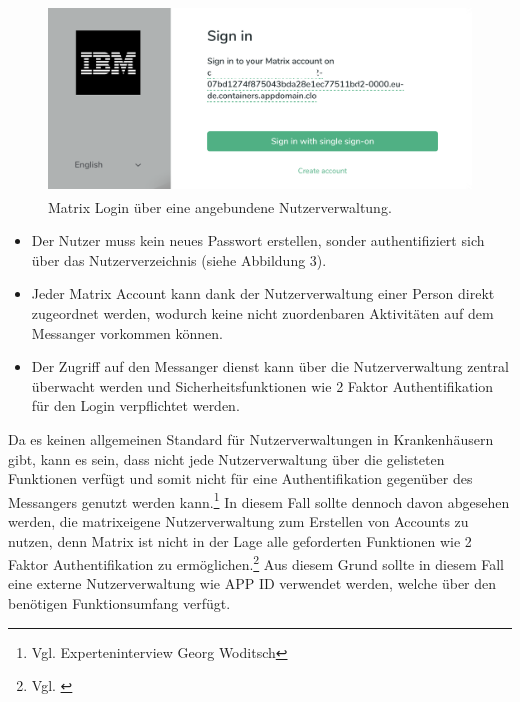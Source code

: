 \begin{figure}[htb]
    \centering
    \includegraphics[height=5cm]{graphics/sso.png}
    \caption[Matrix Login über eine angebundene Nutzerverwaltung]{Matrix Login über eine angebundene Nutzerverwaltung.}
    \label{abb:DHBWLogo}
\end{figure}

\begin{itemize}
    \item Der Nutzer muss kein neues Passwort erstellen, sonder authentifiziert sich über das Nutzerverzeichnis (siehe Abbildung 3).
    \item Jeder Matrix Account kann dank der Nutzerverwaltung einer Person direkt zugeordnet werden, wodurch keine nicht zuordenbaren Aktivitäten auf dem Messanger vorkommen können.  
    \item Der Zugriff auf den Messanger 
dienst kann über die Nutzerverwaltung zentral überwacht werden und Sicherheitsfunktionen wie 2 Faktor Authentifikation für den Login verpflichtet werden. 
\end{itemize}

Da es keinen allgemeinen Standard für Nutzerverwaltungen in Krankenhäusern gibt, kann es sein, dass nicht jede Nutzerverwaltung über die gelisteten Funktionen verfügt und somit nicht für eine Authentifikation gegenüber des Messangers genutzt werden kann.\footnote{Vgl. Experteninterview Georg Woditsch} In diesem Fall sollte dennoch davon abgesehen werden, die matrixeigene Nutzerverwaltung zum Erstellen von Accounts zu nutzen, denn Matrix ist nicht in der Lage alle geforderten Funktionen wie 2 Faktor Authentifikation zu ermöglichen.\footnote{Vgl. \cite{Matirx.org-specifications2020}} Aus diesem Grund sollte in diesem Fall eine externe Nutzerverwaltung wie APP ID verwendet werden, welche über den benötigen Funktionsumfang verfügt.

